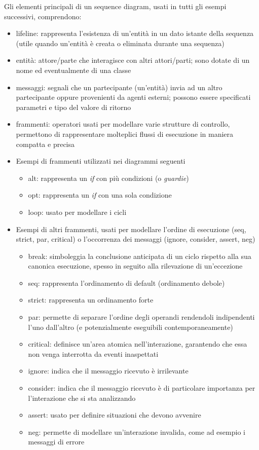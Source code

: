 Gli elementi principali di un sequence diagram, usati in tutti gli esempi successivi, comprendono:
\begin{itemize}
\item lifeline: rappresenta l'esistenza di un'entità in un dato istante della sequenza (utile quando un'entità è creata o eliminata durante una sequenza)
\item entità: attore/parte che interagisce con altri attori/parti; sono dotate di un nome ed eventualmente di una classe
\item messaggi: segnali che un partecipante (un'entità) invia ad un altro partecipante oppure provenienti da agenti esterni; possono essere specificati parametri e tipo del valore di ritorno
\item frammenti: operatori usati per modellare varie strutture di controllo, permettono di rappresentare molteplici flussi di esecuzione in maniera compatta e precisa
\item Esempi di frammenti utilizzati nei diagrammi seguenti
\begin{itemize}
    \item alt: rappresenta un \textit{if} con più condizioni (o \textit{guardie})
    \item opt: rappresenta un \textit{if} con una sola condizione
    \item loop: usato per modellare i cicli
\end{itemize}
\item Esempi di altri frammenti, usati per modellare l'ordine di esecuzione (seq, strict, par, critical) o l'occorrenza dei messaggi (ignore, consider, assert, neg)
\begin{itemize}
\item break: simboleggia la conclusione anticipata di un ciclo rispetto alla sua canonica esecuzione, spesso in seguito alla rilevazione di un'eccezione
\item seq: rappresenta l'ordinamento di default (ordinamento debole)
\item strict: rappresenta un ordinamento forte
\item par: permette di separare l'ordine degli operandi rendendoli indipendenti l'uno dall'altro (e potenzialmente eseguibili contemporaneamente)
\item critical: definisce un'area atomica nell'interazione, garantendo che essa non venga interrotta da eventi inaspettati
\item ignore: indica che il messaggio ricevuto è irrilevante
\item consider: indica che il messaggio ricevuto è di particolare importanza per l'interazione che si sta analizzando
\item assert: usato per definire situazioni che devono avvenire
\item neg: permette di modellare un'interazione invalida, come ad esempio i messaggi di errore
\end{itemize}
\end{itemize}

